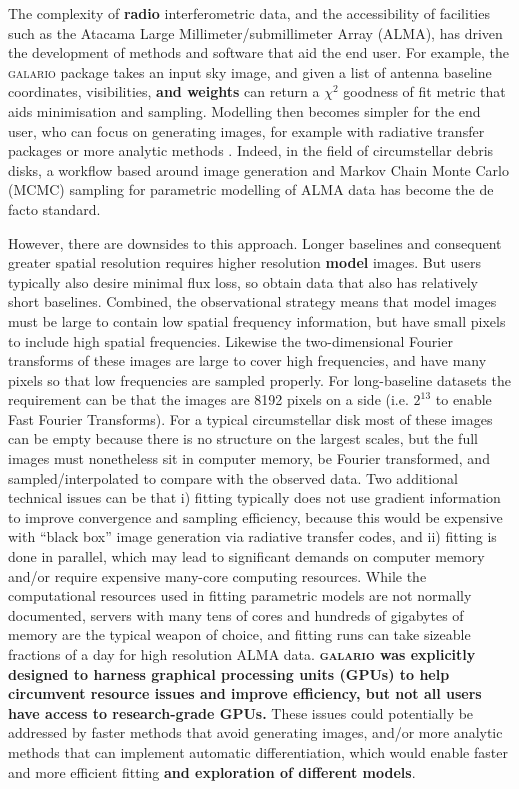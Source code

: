 \documentclass[fleqn,usenatbib]{mnras}
\begin{document}
The complexity of \textbf{radio} interferometric data, and the accessibility of facilities such as the Atacama Large Millimeter/submillimeter Array (ALMA), has driven the development of methods and software that aid the end user. For example, the \textsc{galario} package \citep{2018MNRAS.476.4527T} takes an input sky image, and given a list of antenna baseline coordinates, visibilities, \textbf{and weights} can return a $\chi^2$ goodness of fit metric that aids minimisation and sampling. Modelling then becomes simpler for the end user, who can focus on generating images, for example with radiative transfer packages \citep[e.g. RADMC,][]{2012ascl.soft02015D} or more analytic methods \citep[e.g.][]{2021MNRAS.504.4497C}. Indeed, in the field of circumstellar debris disks, a workflow based around image generation and Markov Chain Monte Carlo (MCMC) sampling for parametric modelling of ALMA data has become the de facto standard.

However, there are downsides to this approach. Longer  baselines and consequent greater spatial resolution requires higher resolution \textbf{model} images. But users typically also desire minimal flux loss, so obtain data that also has relatively short baselines.  Combined, the observational strategy means that model images must be large to contain low spatial frequency information, but have small pixels to include high spatial frequencies. Likewise the two-dimensional Fourier transforms of these images are large to cover high frequencies, and have many pixels so that low frequencies are sampled properly. For long-baseline datasets the requirement can be that the images are 8192 pixels on a side (i.e. $2^{13}$ to enable Fast Fourier Transforms). For a typical circumstellar disk most of these images can be empty because there is no structure on the largest scales, but the full images must nonetheless sit in computer memory, be Fourier transformed, and sampled/interpolated to compare with the observed data. Two additional technical issues can be that i) fitting typically does not use gradient information to improve convergence and sampling efficiency, because this would be expensive with ``black box'' image generation via radiative transfer codes, and ii) fitting is done in parallel, which may lead to significant demands on computer memory and/or require expensive many-core computing resources. While the computational resources used in fitting parametric models are not normally documented, servers with many tens of cores and hundreds of gigabytes of memory are the typical weapon of choice, and fitting runs can take sizeable fractions of a day for high resolution ALMA data. \textbf{\textsc{galario} was explicitly designed to harness graphical processing units (GPUs) to help circumvent resource issues and improve efficiency, but not all users have access to research-grade GPUs.} These issues could potentially be addressed by faster methods that avoid generating images, and/or more analytic methods that can implement automatic differentiation, which would enable faster and more efficient fitting \textbf{and exploration of different models}.
\end{document}
